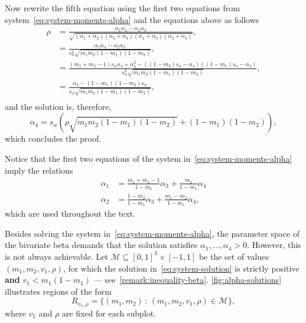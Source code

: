 \documentclass[a4paper, notitlepage, 10pt]{article}
\theoremstyle{definition}
\begin{document}
\begin{proofEnd}
    Now rewrite the fifth equation using the first two equations from system~\eqref{eq:system-moments-alpha} and the equations above as follows 
    \begin{equation}
        \label{eq:rho-equation}
        \begin{split}
            \rho &= \frac{\alpha_1\alpha_4 - \alpha_2\alpha_3}{\sqrt{(\alpha_1+\alpha_2)(\alpha_3+\alpha_4)(\alpha_1+\alpha_3)(\alpha_2+\alpha_4)}}, \\ 
            &= \frac{\alpha_1\alpha_4 - \alpha_2\alpha_3}{s_{\alpha}^2\sqrt{m_1m_2(1-m_1)(1-m_2)}}, \\ 
            &= \frac{(m_1 + m_2 - 1)s_{\alpha}\alpha_4 + \alpha_4^2 - ((1-m_2)s_{\alpha} - \alpha_4)((1-m_1)s_{\alpha} - \alpha_4)}{s_{\alpha}^2\sqrt{m_1m_2(1-m_1)(1-m_2)}}, \\
            &= \frac{\alpha_4 - (1-m_1)(1-m_2)s_{\alpha}}{s_{\alpha}\sqrt{m_1m_2(1-m_1)(1-m_2)}}, \\ 
        \end{split}
    \end{equation}
    and the solution is, therefore, 
    \[
    \alpha_4 = s_{\alpha}\left(\rho\sqrt{m_1m_2(1-m_1)(1-m_2)} + (1-m_1)(1-m_2)\right),
    \]
    which concludes the proof.
\end{proofEnd}
Notice that the first two equations of the system in~\eqref{eq:system-moments-alpha} imply the relations
\begin{align}
  \label{eq:alpha1-as-function-alpha3-alpha4}
  \alpha_1 &= \frac{m_1+m_2-1}{1-m_1}\alpha_3 + \frac{m_2}{1-m_1}\alpha_4 \\
  \label{eq:alpha2-as-function-alpha3-alpha4}
  \alpha_2 &= \frac{1-m_2}{1-m_1}\alpha_3 + \frac{m_1-m_2}{1-m_1}\alpha_4,
\end{align}
which are used throughout the text.

Besides solving the system in~\eqref{eq:system-moments-alpha}, the parameter space of the bivariate beta demands that the solution satisfies $\alpha_1, \dots, \alpha_4 > 0$.
However, this is not always achievable.
Let $\mathcal{M} \subseteq {[0,1]}^3 \times [-1,1]$ be the set of values $(m_1, m_2, v_1, \rho)$, for which the solution in~\eqref{eq:system-solution} is strictly positive \textbf{and} $v_1 < m_1(1 - m_1)$ --- see~\autoref{remark:inequality-beta}.
\autoref{fig:alpha-solutions} illustrates regions of the form
\[
R_{v_1, \rho} = \{(m_1, m_2) \,:\, (m_1, m_2, v_1, \rho) \in \mathcal{M} \},
\]
where $v_1$ and $\rho$ are fixed for each subplot.
\end{document}
